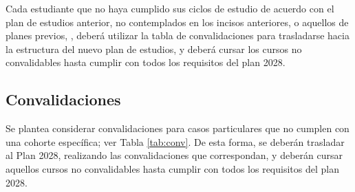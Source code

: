Cada estudiante que no haya cumplido sus ciclos de estudio de acuerdo con el plan de estudios anterior, no contemplados en los incisos anteriores, o aquellos de planes previos, , deberá utilizar la tabla de convalidaciones para trasladarse hacia la estructura del nuevo plan de estudios, y deberá cursar los cursos no convalidables hasta cumplir con todos los requisitos del plan 2028.

\subsection{Convalidaciones}\label{subsec:convalid}

Se plantea considerar convalidaciones para casos particulares que no cumplen con una cohorte específica; ver Tabla \ref{tab:conv}. De esta forma, se deberán trasladar al Plan 2028, realizando las convalidaciones que correspondan, y deberán cursar aquellos cursos no convalidables hasta cumplir con todos los requisitos del plan 2028.

